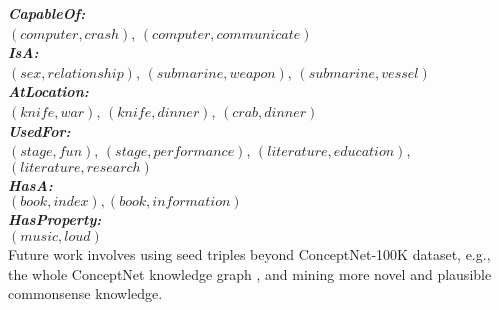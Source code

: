 \documentclass[11pt]{article}
\begin{document}
\noindent
\textbf{\textit{CapableOf:}}\\
$(computer, crash)$, $(computer, communicate)$\\
\textbf{\textit{IsA:}}\\
$(sex, relationship)$, $(submarine, weapon)$, $(submarine, vessel)$\\
\textbf{\textit{AtLocation:}}\\
$(knife, war)$, $(knife, dinner)$, $(crab, dinner)$\\
\textbf{\textit{UsedFor:}}\\
$(stage, fun)$, $(stage, performance)$, $(literature, education)$, $(literature, research)$\\
\textbf{\textit{HasA:}}\\
$(book, index), (book, information)$\\
\textbf{\textit{HasProperty:}}\\
$(music, loud)$\\
Future work involves using seed triples beyond ConceptNet-100K dataset, e.g., the whole ConceptNet knowledge graph , and mining more novel and plausible commonsense knowledge.
\end{document}

